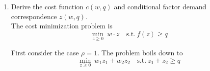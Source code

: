 \documentclass{article}
\begin{document}
\begin{enumerate}
\item Derive the cost function $c(w,q)$ and conditional factor demand
      correspondence $z(w,q)$.\\

The cost minimization problem is
\[ \underset{z\geq 0}{\min}\ w \cdot z\quad \textrm{s.t.}\ f(z) \geq q \]

First consider the case $\rho=1$. The problem boils down to 
\[ \underset{z\geq 0}{\min}\ w_1z_1+w_2z_2 \quad \textrm{s.t.}\ z_1+z_2 \geq q \]


\end{enumerate}
\end{document}

